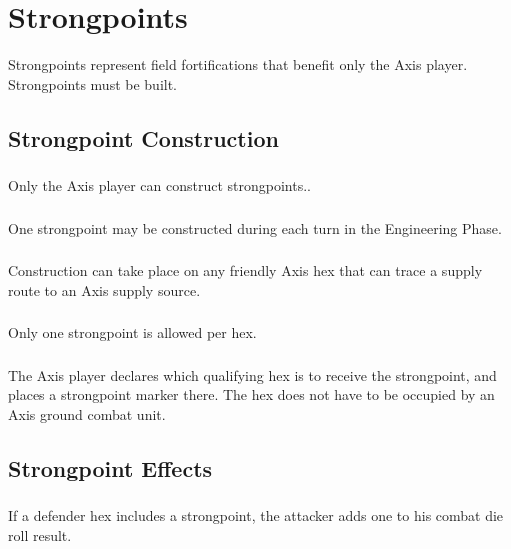 \section{Strongpoints}

Strongpoints represent field fortifications that benefit only the Axis player. Strongpoints must be built.

\subsection{Strongpoint Construction}

\subsubsection{} Only the Axis player can construct strongpoints..

\subsubsection{} One strongpoint may be constructed during each turn in the Engineering Phase.

\subsubsection{} Construction can take place on any friendly Axis hex that can trace a supply route to an Axis supply source.

\subsubsection{} Only one strongpoint is allowed per hex.

\subsubsection{} The Axis player declares which qualifying hex is to receive the strongpoint, and places a strongpoint marker there. The hex does not have to be occupied by an Axis ground combat unit.

\subsection{Strongpoint Effects}

\subsubsection{} If a defender hex includes a strongpoint, the attacker adds one to his combat die roll result.

